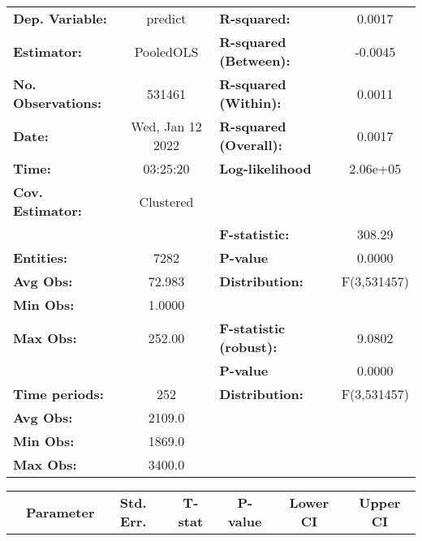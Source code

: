 \begin{center}
\begin{tabular}{lclc}
\toprule
\textbf{Dep. Variable:}    &      predict       & \textbf{  R-squared:         }   &      0.0017      \\
\textbf{Estimator:}        &     PooledOLS      & \textbf{  R-squared (Between):}  &     -0.0045      \\
\textbf{No. Observations:} &       531461       & \textbf{  R-squared (Within):}   &      0.0011      \\
\textbf{Date:}             &  Wed, Jan 12 2022  & \textbf{  R-squared (Overall):}  &      0.0017      \\
\textbf{Time:}             &      03:25:20      & \textbf{  Log-likelihood     }   &     2.06e+05     \\
\textbf{Cov. Estimator:}   &     Clustered      & \textbf{                     }   &                  \\
\textbf{}                  &                    & \textbf{  F-statistic:       }   &      308.29      \\
\textbf{Entities:}         &        7282        & \textbf{  P-value            }   &      0.0000      \\
\textbf{Avg Obs:}          &       72.983       & \textbf{  Distribution:      }   &   F(3,531457)    \\
\textbf{Min Obs:}          &       1.0000       & \textbf{                     }   &                  \\
\textbf{Max Obs:}          &       252.00       & \textbf{  F-statistic (robust):} &      9.0802      \\
\textbf{}                  &                    & \textbf{  P-value            }   &      0.0000      \\
\textbf{Time periods:}     &        252         & \textbf{  Distribution:      }   &   F(3,531457)    \\
\textbf{Avg Obs:}          &       2109.0       & \textbf{                     }   &                  \\
\textbf{Min Obs:}          &       1869.0       & \textbf{                     }   &                  \\
\textbf{Max Obs:}          &       3400.0       & \textbf{                     }   &                  \\
\bottomrule
\end{tabular}
\begin{tabular}{lcccccc}
                & \textbf{Parameter} & \textbf{Std. Err.} & \textbf{T-stat} & \textbf{P-value} & \textbf{Lower CI} & \textbf{Upper CI}  \\

\end{tabular}
\end{center}
